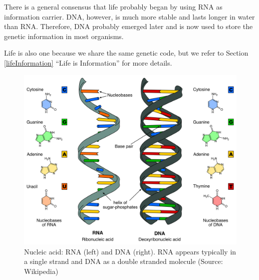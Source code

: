 \documentclass[
  11pt,
]{book}
\begin{document}
There is a general consensus that life probably began by using RNA as information carrier.
DNA, however, is much more stable and lasts longer in water than RNA. Therefore, DNA probably emerged later and is now used to store the genetic information in most organisms.

Life is also one because we share the same genetic code, but we refer to Section \ref{lifeInformation} ``Life is Information'' for more details.

\begin{figure}

{\centering \includegraphics[width=0.5\linewidth]{./figs/Difference_DNA_RNA-EN} 

}

\caption{Nucleic acid: RNA (left) and DNA (right). RNA appears typically in a single strand and DNA as a double stranded molecule (Source: Wikipedia)}\label{fig:RNAvsDNA}
\end{figure}
\end{document}
